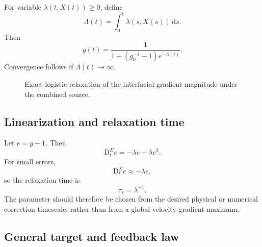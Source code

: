 \documentclass[11pt,a4paper]{article}
\theoremstyle{definition}
\theoremstyle{remark}
\newcommand{\material}{\mathrm{D}_t}
\begin{document}
For variable $\lambda(t,X(t))\ge0$, define
\[
  \Lambda(t)=\int_0^t\lambda(s,X(s))\,\mathrm ds.
\]
Then
\begin{equation}
  g(t)=\frac{1}{1+\left(g_0^{-1}-1\right)e^{-\Lambda(t)}}.
\end{equation}
Convergence follows if $\Lambda(t)\to\infty$.

\begin{figure}[htbp]
\centering
{}
\caption{Exact logistic relaxation of the interfacial gradient magnitude under the combined source.}
\label{fig:logistic}
\end{figure}

\subsection{Linearization and relaxation time}

Let $e=g-1$. Then
\begin{equation}
  \material^{\Sigma}e=-\lambda e-\lambda e^2.
\end{equation}
For small errors,
\begin{equation}
  \material^{\Sigma}e\approx-\lambda e,
\end{equation}
so the relaxation time is
\begin{equation}
  \tau_r=\lambda^{-1}.
  \label{eq:relaxation-time}
\end{equation}
The parameter should therefore be chosen from the desired physical or numerical correction timescale, rather than from a global velocity-gradient maximum.

\subsection{General target and feedback law}
\end{document}
